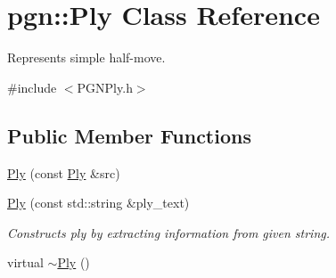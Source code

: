 \hypertarget{classpgn_1_1Ply}{
\section{pgn::Ply Class Reference}
\label{classpgn_1_1Ply}
}


Represents simple half-\/move.  




{\ttfamily \#include $<$PGNPly.h$>$}

\subsection*{Public Member Functions}
\begin{DoxyCompactItemize}
\item 
\hyperlink{classpgn_1_1Ply_aed26da0eafcb47e74ec80413bfe812d2}{Ply} (const \hyperlink{classpgn_1_1Ply}{Ply} \&src)
\item 
\hyperlink{classpgn_1_1Ply_af9105fdc769d5e28e78b6713b591a26f}{Ply} (const std::string \&ply\_\-text)
\begin{DoxyCompactList}\small\item\em Constructs ply by extracting information from given string. \item\end{DoxyCompactList}\item 
\hypertarget{classpgn_1_1Ply_a76a66aea2977eaa2a746564429c70025}{
virtual \hyperlink{classpgn_1_1Ply_a76a66aea2977eaa2a746564429c70025}{$\sim$Ply} ()}
\label{classpgn_1_1Ply_a76a66aea2977eaa2a746564429c70025}


\end{DoxyCompactItemize}
